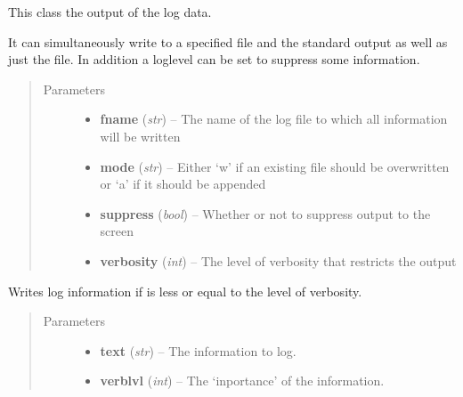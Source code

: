 \documentclass[letterpaper,10pt,english]{sphinxmanual}
\begin{document}
\begin{fulllineitems}
\label{pytrajectory:pytrajectory.log.Logger}
This class the output of the log data.

It can simultaneously write to a specified file and the standard output as well as just the
file. In addition a loglevel can be set to suppress some information.
\begin{quote}\begin{description}
\item[{Parameters}] \leavevmode\begin{itemize}
\item {} 
\textbf{fname} (\emph{str}) -- The name of the log file to which all information will be written

\item {} 
\textbf{mode} (\emph{str}) -- Either `w' if an existing file should be overwritten or `a' if it should be appended

\item {} 
\textbf{suppress} (\emph{bool}) -- Whether or not to suppress output to the screen

\item {} 
\textbf{verbosity} (\emph{int}) -- The level of verbosity that restricts the output

\end{itemize}

\end{description}\end{quote}

\begin{fulllineitems}
\label{pytrajectory:pytrajectory.log.Logger.write}
Writes log information if  is less or equal to the level of verbosity.
\begin{quote}\begin{description}
\item[{Parameters}] \leavevmode\begin{itemize}
\item {} 
\textbf{text} (\emph{str}) -- The information to log.

\item {} 
\textbf{verblvl} (\emph{int}) -- The `inportance' of the information.

\end{itemize}

\end{description}\end{quote}

\end{fulllineitems}


\end{fulllineitems}
\end{document}
